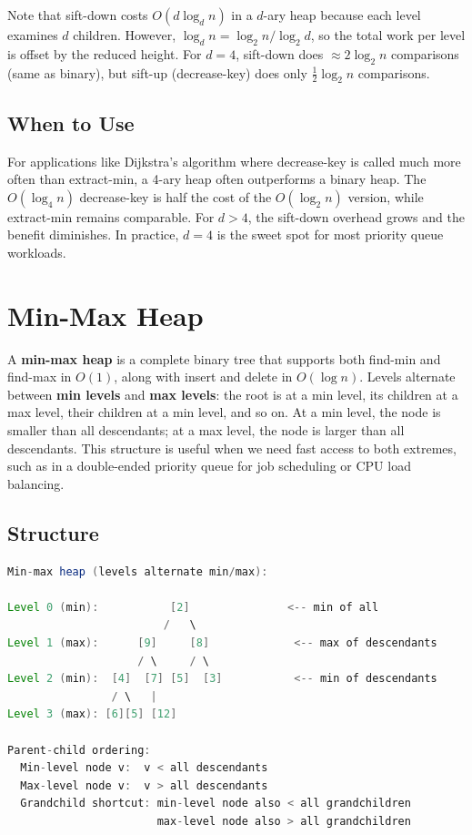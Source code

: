 Note that sift-down costs $O(d \log_d n)$ in a $d$-ary heap because each level examines $d$ children. However, $\log_d n = \log_2 n / \log_2 d$, so the total work per level is offset by the reduced height. For $d = 4$, sift-down does $\approx 2 \log_2 n$ comparisons (same as binary), but sift-up (decrease-key) does only $\frac{1}{2} \log_2 n$ comparisons.

\subsection{When to Use}

For applications like Dijkstra's algorithm where decrease-key is called much more often than extract-min, a 4-ary heap often outperforms a binary heap. The $O(\log_4 n)$ decrease-key is half the cost of the $O(\log_2 n)$ version, while extract-min remains comparable. For $d > 4$, the sift-down overhead grows and the benefit diminishes. In practice, $d = 4$ is the sweet spot for most priority queue workloads.

\section{Min-Max Heap}

A \textbf{min-max heap} is a complete binary tree that supports both find-min and find-max in $O(1)$, along with insert and delete in $O(\log n)$. Levels alternate between \textbf{min levels} and \textbf{max levels}: the root is at a min level, its children at a max level, their children at a min level, and so on. At a min level, the node is smaller than all descendants; at a max level, the node is larger than all descendants. This structure is useful when we need fast access to both extremes, such as in a double-ended priority queue for job scheduling or CPU load balancing.

\subsection{Structure}

\begin{lstlisting}[language=Java]
Min-max heap (levels alternate min/max):

Level 0 (min):           [2]               <-- min of all
                        /   \
Level 1 (max):      [9]     [8]             <-- max of descendants
                    / \     / \
Level 2 (min):  [4]  [7] [5]  [3]           <-- min of descendants
                / \   |
Level 3 (max): [6][5] [12]

Parent-child ordering:
  Min-level node v:  v < all descendants
  Max-level node v:  v > all descendants
  Grandchild shortcut: min-level node also < all grandchildren
                       max-level node also > all grandchildren
\end{lstlisting}

